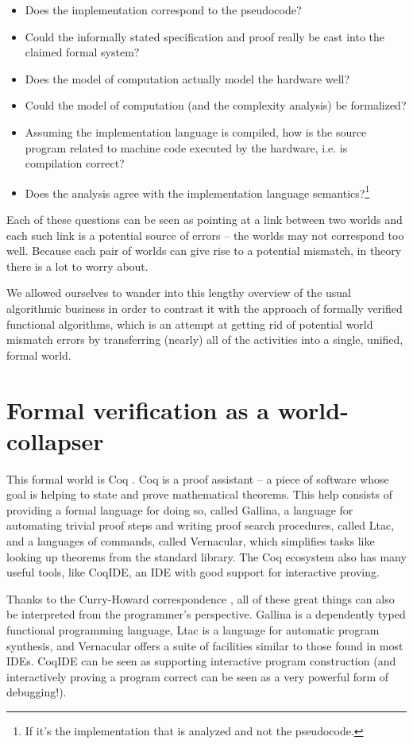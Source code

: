 \documentclass[declaration,mgr,english,shortabstract]{iithesis}
\begin{document}
\begin{itemize}
    \item Does the implementation correspond to the pseudocode?
    \item Could the informally stated specification and proof really be cast into the claimed formal system?
    \item Does the model of computation actually model the hardware well?
    \item Could the model of computation (and the complexity analysis) be formalized?
    \item Assuming the implementation language is compiled, how is the source program related to machine code executed by the hardware, i.e. is compilation correct?\item Does the analysis agree with the implementation language semantics?\footnote{If it's the implementation that is analyzed and not the pseudocode.}
\end{itemize}

Each of these questions can be seen as pointing at a link between two worlds and each such link is a potential source of errors -- the worlds may not correspond too well. Because each pair of worlds can give rise to a potential mismatch, in theory there is a lot to worry about.

We allowed ourselves to wander into this lengthy overview of the usual algorithmic business in order to contrast it with the approach of formally verified functional algorithms, which is an attempt at getting rid of potential world mismatch errors by transferring (nearly) all of the activities into a single, unified, formal world.

\section{Formal verification as a world-collapser} \label{formal}

This formal world is Coq \cite{Coq}. Coq is a proof assistant -- a piece of software whose goal is helping to state and prove mathematical theorems. This help consists of providing a formal language
for doing so, called Gallina, a language for automating trivial proof steps and writing proof search procedures, called Ltac, and a languages of commands, called Vernacular, which simplifies tasks like looking up theorems from the standard library. The Coq ecosystem also has many useful tools, like CoqIDE, an IDE with good support for interactive proving.

Thanks to the Curry-Howard correspondence \cite{CurryHoward}, all of these great things can also be interpreted from the programmer's perspective. Gallina is a dependently typed functional programming language, Ltac is a language for automatic program synthesis, and Vernacular offers a suite of facilities similar to those found in most IDEs. CoqIDE can be seen as supporting interactive program construction (and interactively proving a program correct can be seen as a very powerful form of debugging!).
\end{document}
